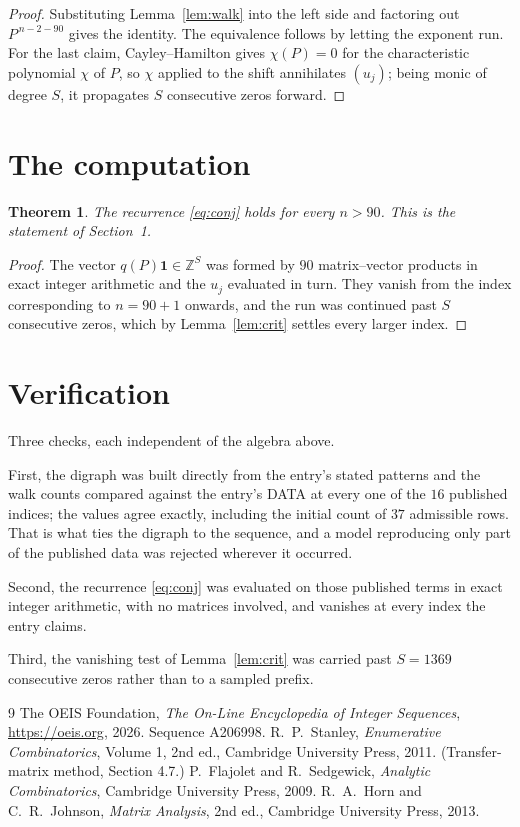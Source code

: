 \documentclass[11pt,a4paper]{article}
\theoremstyle{plain}
\newtheorem{theorem}{Theorem}
\theoremstyle{definition}
\begin{document}
\begin{proof}
Substituting Lemma~\ref{lem:walk} into the left side and factoring out
$P^{\,n-2-90}$ gives the identity. The equivalence follows by letting the exponent
run. For the last claim, Cayley--Hamilton gives $\chi(P)=0$ for the characteristic
polynomial $\chi$ of $P$, so $\chi$ applied to the shift annihilates $(u_j)$; being monic of
degree $S$, it propagates $S$ consecutive zeros forward.
\end{proof}

\section{The computation}

\begin{theorem}
The recurrence \eqref{eq:conj} holds for every $n>90$. This is the statement of
Section~1.
\end{theorem}

\begin{proof}
The vector $q(P)\mathbf{1}\in\mathbb{Z}^{S}$ was formed by $90$ matrix--vector
products in exact integer arithmetic and the $u_j$ evaluated in turn. They vanish from the
index corresponding to $n=90+1$ onwards, and the run was continued past $S$ consecutive
zeros, which by Lemma~\ref{lem:crit} settles every larger index.
\end{proof}

\section{Verification}

Three checks, each independent of the algebra above.

First, the digraph was built directly from the entry's stated patterns and the walk counts
compared against the entry's DATA at every one of the $16$ published indices; the
values agree exactly, including the initial count of $37$ admissible rows. That is
what ties the digraph to the sequence, and a model reproducing only part of the published
data was rejected wherever it occurred.

Second, the recurrence \eqref{eq:conj} was evaluated on those published terms in exact
integer arithmetic, with no matrices involved, and vanishes at every index the entry claims.

Third, the vanishing test of Lemma~\ref{lem:crit} was carried past $S=1369$ consecutive
zeros rather than to a sampled prefix.

\begin{thebibliography}{9}
 The OEIS Foundation, \emph{The On-Line Encyclopedia of Integer
Sequences}, \url{https://oeis.org}, 2026. Sequence A206998.
 R.~P.~Stanley, \emph{Enumerative Combinatorics}, Volume 1, 2nd ed.,
Cambridge University Press, 2011. (Transfer-matrix method, Section 4.7.)
 P.~Flajolet and R.~Sedgewick, \emph{Analytic Combinatorics}, Cambridge
University Press, 2009.
 R.~A.~Horn and C.~R.~Johnson, \emph{Matrix Analysis}, 2nd ed., Cambridge
University Press, 2013.
\end{thebibliography}
\end{document}
